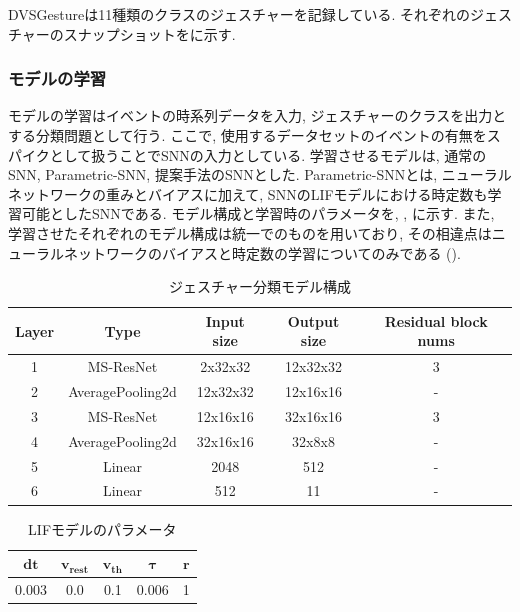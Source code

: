 DVSGestureは11種類のクラスのジェスチャーを記録している.
それぞれのジェスチャーのスナップショットをに示す.


\subsubsection{モデルの学習}
モデルの学習はイベントの時系列データを入力, ジェスチャーのクラスを出力とする分類問題として行う.
ここで, 使用するデータセットのイベントの有無をスパイクとして扱うことでSNNの入力としている.
学習させるモデルは, 通常のSNN, Parametric-SNN, 提案手法のSNNとした.
Parametric-SNNとは, ニューラルネットワークの重みとバイアスに加えて, SNNのLIFモデルにおける時定数も学習可能としたSNNである.
モデル構成と学習時のパラメータを, , に示す.
また, 学習させたそれぞれのモデル構成は統一でのものを用いており, その相違点はニューラルネットワークのバイアスと時定数の学習についてのみである ().
\begin{table}[htb]
    \centering
    \caption{ジェスチャー分類モデル構成}
    \label{tab:exp2:model}
    \begin{tabular}{ccccc}
        \hline
        \textbf{Layer}& \textbf{Type}&\textbf{Input size} & \textbf{Output size} & \textbf{Residual block nums}\\
        \hline
        1   & MS-ResNet & 2x32x32 & 12x32x32 & 3\\
        2 & AveragePooling2d & 12x32x32 & 12x16x16 & - \\
        3 & MS-ResNet & 12x16x16 & 32x16x16 & 3\\
        4 & AveragePooling2d & 32x16x16 & 32x8x8 & - \\
        5 & Linear & 2048 & 512 & - \\
        6 & Linear & 512 & 11 & - \\
        \hline
    \end{tabular}
\end{table}

\begin{table}[htb]
    \centering
    \caption{LIFモデルのパラメータ}
    \label{tab:exp2:model:parameter:lif}
    \begin{tabular}{ccccc}
        \hline
        $\bm{dt}$& $\bm{v_{rest}}$ & $\bm{v_{th}}$ & $\bm{\tau}$ & $\bm{r}$\\
        \hline
        0.003   & 0.0 & 0.1 & 0.006 & 1 \\
        \hline
    \end{tabular}
\end{table}



